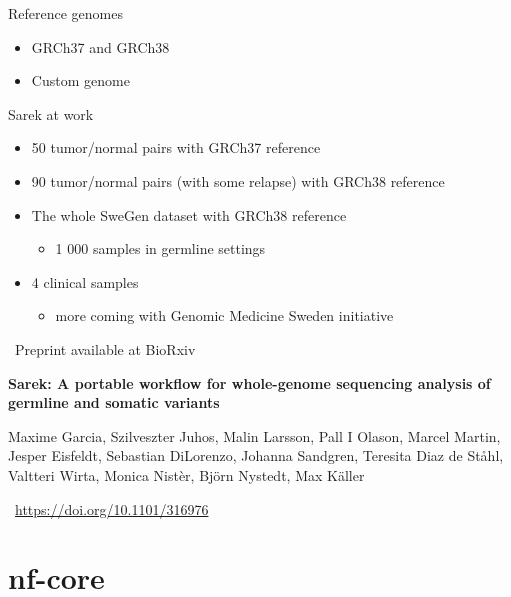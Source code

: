 \documentclass[usepdftitle=false]{beamer}
\begin{document}
\begin{frame}{Reference genomes}
	\begin{itemize}
		\item GRCh37 and GRCh38
		\pause
		\item Custom genome
	\end{itemize}
\end{frame}

\begin{frame}{Sarek at work}
	\begin{itemize}
		\item	50 tumor/normal pairs with GRCh37 reference
		\pause
		\item	90 tumor/normal pairs (with some relapse) with GRCh38 reference
		\pause
		\item	The whole SweGen dataset with GRCh38 reference
		\begin{itemize}
			\item	1 000 samples in germline settings
		\end{itemize}
		\pause
		\item	4 clinical samples
		\begin{itemize}
			\item	more coming with Genomic Medicine Sweden initiative
		\end{itemize}
	\end{itemize}
\end{frame}

\begin{frame}{\faWrench\ Preprint available at BioRxiv}

	\textbf{Sarek: A portable workflow for whole-genome sequencing analysis of germline and somatic variants}

	\small{Maxime Garcia,
	Szilveszter Juhos,
	Malin Larsson,
	Pall I Olason,
	Marcel Martin,
	Jesper Eisfeldt,
	Sebastian DiLorenzo,
	Johanna Sandgren,
	Teresita Diaz de Ståhl,
	Valtteri Wirta,
	Monica Nistèr,
	Björn Nystedt,
	Max Käller}

	\aiDoi\ \url{https://doi.org/10.1101/316976}
\end{frame}

\section{nf-core}
\end{document}
